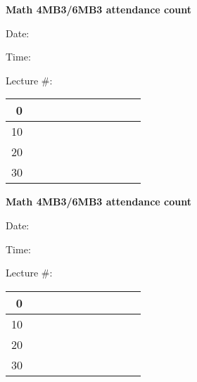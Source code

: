 \documentclass[12pt]{article}
\newcommand{\attendancetableline}[1]{#1 & & & & & & & & & & \\ \hline}
\newcommand{\attendancetable}{%
\begin{tabularx}{0.75\textwidth}{ r | X | X | X | X | X || X | X | X | X | X |}
  \hline
  \attendancetableline{0}
  \attendancetableline{10}
  \attendancetableline{20}
  \attendancetableline{30}
\end{tabularx}
}
\begin{document}
\Huge


\begin{center}
{\bfseries Math 4MB3/6MB3 attendance count}
\end{center}

\medskip
Date: \underline{\hspace{10cm}}

\medskip
Time: \underline{\hspace{5cm}}

\medskip
Lecture \#: \underline{\hspace{2.5cm}}

\vspace{12pt}
\begin{center}
\attendancetable
\end{center}


\vspace{1in}

\begin{center}
{\bfseries Math 4MB3/6MB3 attendance count}
\end{center}

\medskip
Date: \underline{\hspace{10cm}}

\medskip
Time: \underline{\hspace{5cm}}

\medskip
Lecture \#: \underline{\hspace{2.5cm}}

\vspace{12pt}
\begin{center}
\attendancetable
\end{center}
\end{document}

